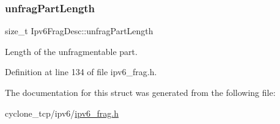 \subsubsection{\texorpdfstring{unfrag\+Part\+Length}{unfragPartLength}}
{\footnotesize\ttfamily size\+\_\+t Ipv6\+Frag\+Desc\+::unfrag\+Part\+Length}



Length of the unfragmentable part. 



Definition at line 134 of file ipv6\+\_\+frag.\+h.



The documentation for this struct was generated from the following file\+:\begin{DoxyCompactItemize}
\item 
cyclone\+\_\+tcp/ipv6/\hyperlink{ipv6__frag_8h}{ipv6\+\_\+frag.\+h}\end{DoxyCompactItemize}
